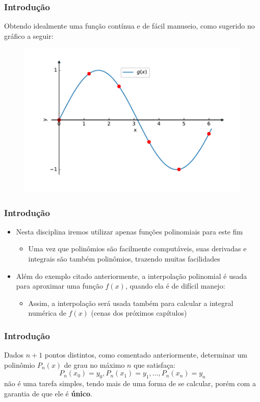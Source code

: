 \documentclass{beamer}
\theoremstyle{mystyle}
\begin{document}
\begin{frame}
	\frametitle{Introdução}
	Obtendo idealmente uma função contínua e de fácil manuseio, como sugerido no gráfico a seguir:
	\begin{figure}
		\centering
		\includegraphics[width=0.8\linewidth]{Figuras/grafico_02}
		\label{fig:grafico02}
	\end{figure}	
\end{frame}

\begin{frame}
	\frametitle{Introdução}
	\begin{itemize}
		\item Nesta disciplina iremos utilizar apenas funções polinomiais para este fim
		\begin{itemize}
			\item Uma vez que polinômios são facilmente computáveis, suas derivadas e integrais são também polinômios, trazendo muitas facilidades
		\end{itemize}
		\item Além do exemplo citado anteriormente, a interpolação polinomial é usada para aproximar uma função	$ f (x) $, quando ela é de difícil manejo:
		\begin{itemize}
			\item Assim, a interpolação será usada também para calcular a integral numérica de $ f (x) $ (cenas dos próximos capítulos)
		\end{itemize}
	\end{itemize}
\end{frame}

\begin{frame}
	\frametitle{Introdução}
	Dados $ n + 1 $ pontos distintos, como comentado anteriormente, determinar um polinômio $ P_{n} (x) $ de grau no máximo $ n $ que satisfaça:
	\begin{equation*}
		P_{n}(x_{0}) = y_{0}, P_{n}(x_{1}) = y_{1},\ldots, P_{n}(x_{n}) = y_{n}
	\end{equation*}
	não é uma tarefa simples, tendo mais de uma forma de se calcular, porém com a garantia de que ele é \textbf{único}.
\end{frame}
\end{document}
